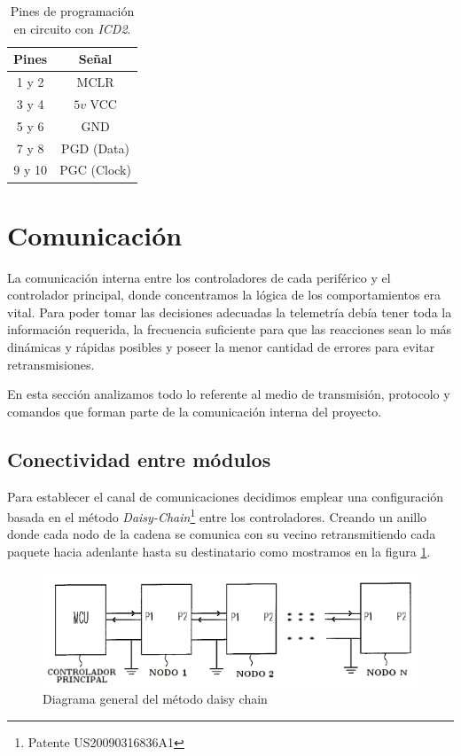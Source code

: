 \begin{table}
	\begin{center}
		\begin{tabular}{|c|c|}
			\hline
			Pines & Se\~nal \\
			\hline
			1 y 2 & MCLR \\
			\hline
			3 y 4 & $5v$ VCC \\
			\hline
			5 y 6 & GND \\
			\hline
			7 y 8 & PGD (Data) \\
			\hline
			9 y 10 & PGC (Clock) \\
			\hline
		\end{tabular}
		\caption{Pines de programaci\'on en circuito con \emph{ICD2}.}
		\label{hT_header_icd2}
	\end{center}
\end{table}


\section{Comunicaci\'on}
\label{h_comm}

La comunicaci\'on interna entre los controladores de cada perif\'erico y el controlador principal, donde concentramos
la l\'ogica de los comportamientos era vital.
Para poder tomar las decisiones adecuadas la telemetr\'ia deb\'ia tener toda la informaci\'on requerida, la frecuencia
suficiente para que las reacciones sean lo m\'as din\'amicas y r\'apidas posibles y poseer la menor cantidad de errores
para evitar retransmisiones.

En esta secci\'on analizamos todo lo referente al medio de transmisi\'on, protocolo y comandos que forman parte de la
comunicaci\'on interna del proyecto.

\subsection{Conectividad entre m\'odulos}
\label{h_comm_conectividad}

Para establecer el canal de comunicaciones decidimos emplear una configuraci\'on basada en el m\'etodo 
\emph{Daisy-Chain}\footnote{Patente US20090316836A1} entre los controladores.
Creando un anillo donde cada nodo de la cadena se comunica con su vecino retransmitiendo cada paquete hacia adenlante 
hasta su destinatario como mostramos en la figura \ref{hF_comm_daisychain}.

\begin{figure}[ht]
	\centering
	\includegraphics[scale=.40]{figuras/daisychain_diagram.png}
	\caption{Diagrama general del m\'etodo daisy chain}
	\label{hF_comm_daisychain}
\end{figure}

